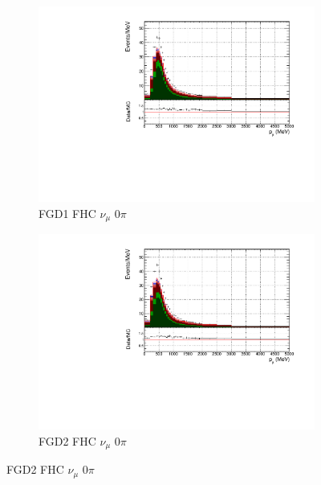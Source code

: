 \begin{figure}[!h]
\begin{subfigure}{0.49\textwidth}
  \centering
  \includegraphics[width=\textwidth]{figs/FGD1_numuCC_0pi_p}
  \caption{FGD1 FHC $\nu_{\mu}$ 0$\pi$}
\end{subfigure}
\begin{subfigure}{0.49\textwidth}
  \centering
  \includegraphics[width=\textwidth]{figs/FGD2_numuCC_0pi_p}
  \caption{FGD2 FHC $\nu_{\mu}$ 0$\pi$}
\end{subfigure}


\end{figure}
